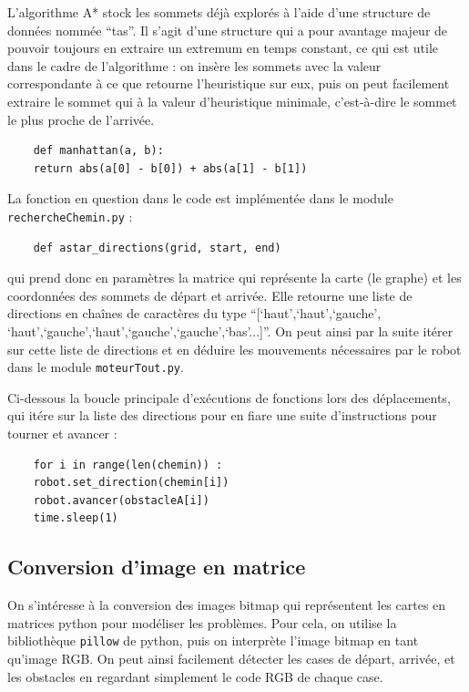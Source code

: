 \documentclass[a4paper,12pt]{report}  %
\begin{document}
L’algorithme A* stock les sommets déjà explorés à l’aide d’une structure de données nommée “tas”. Il s’agit d’une structure qui a pour avantage majeur de pouvoir toujours en extraire un extremum en temps constant, ce qui est utile dans le cadre de l’algorithme : on insère les sommets avec la valeur correspondante à ce que retourne l’heuristique sur eux, puis on peut facilement extraire le sommet qui à la valeur d’heuristique minimale, c’est-à-dire le sommet le plus proche de l’arrivée.

\begin{lstlisting}
	def manhattan(a, b):
	return abs(a[0] - b[0]) + abs(a[1] - b[1])
\end{lstlisting}


La fonction en question dans le code est implémentée dans le module \texttt{rechercheChemin.py} : 
\begin{lstlisting}
	def astar_directions(grid, start, end)
\end{lstlisting}

qui prend donc en paramètres la matrice qui représente la carte (le graphe) et les coordonnées des sommets de départ et arrivée. Elle retourne une liste de directions en chaînes de caractères du type “[‘haut’,‘haut’,‘gauche’, ‘haut’,‘gauche’,‘haut’,‘gauche’,‘gauche’,‘bas’...]”. On peut ainsi par la suite itérer sur cette liste de directions et en déduire les mouvements nécessaires par le robot dans le module \texttt{moteurTout.py}.

Ci-dessous la boucle principale d’exécutions de fonctions lors des déplacements, qui itére sur la liste des directions pour en fiare une suite d’instructions pour tourner et avancer :
\begin{lstlisting}
	for i in range(len(chemin)) :
	robot.set_direction(chemin[i])
	robot.avancer(obstacleA[i])
	time.sleep(1)
\end{lstlisting}

\subsection{Conversion d’image en matrice}
On s'intéresse à la conversion des images bitmap qui représentent les cartes en matrices python pour modéliser les problèmes. Pour cela, on utilise la bibliothèque \texttt{pillow} de python, puis on interprète l’image bitmap en tant qu’image RGB. On peut ainsi facilement détecter les cases de départ, arrivée, et les obstacles en regardant simplement le code RGB de chaque case.
\end{document}

